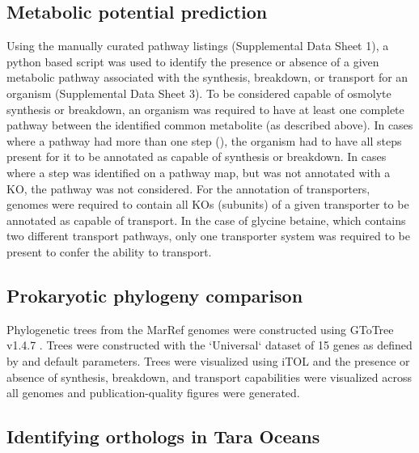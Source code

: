 \documentclass[utf8]{frontiersSCNS} %
\begin{document}
\subsection{Metabolic potential prediction}

Using the manually curated pathway listings (Supplemental Data Sheet 1), a python based script was used to identify the presence or absence of a given metabolic pathway associated with the synthesis, breakdown, or transport for an organism (Supplemental Data Sheet 3). To be considered capable of osmolyte synthesis or breakdown, an organism was required to have at least one complete pathway between the identified common metabolite (as described above). In cases where a pathway had more than one step (), the organism had to have all steps present for it to be annotated as capable of synthesis or breakdown. In cases where a step was identified on a pathway map, but was not annotated with a KO, the pathway was not considered. For the annotation of transporters, genomes were required to contain all KOs (subunits) of a given transporter to be annotated as capable of transport. In the case of glycine betaine, which contains two different transport pathways, only one transporter system was required to be present to confer the ability to transport. 

\subsection{Prokaryotic phylogeny comparison}

Phylogenetic trees from the MarRef genomes were constructed using GToTree v1.4.7 \citep{Lee_2019, Price_2010}. Trees were constructed with the `Universal` dataset of 15 genes as defined by \citet{Hug_2016} and default parameters. Trees were visualized using iTOL  \citep{Letunic_2016} and the presence or absence of synthesis, breakdown, and transport capabilities were visualized across all genomes and publication-quality figures were generated. 


\subsection{Identifying orthologs in Tara Oceans}
\end{document}
